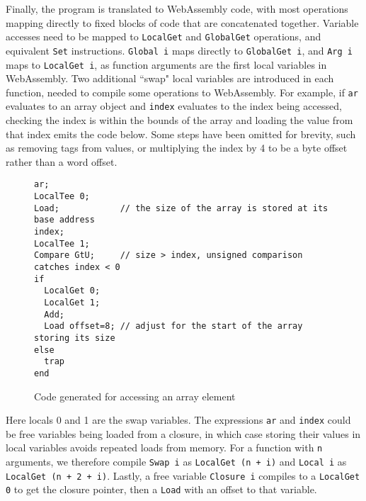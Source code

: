Finally, the program is translated to WebAssembly code, with most operations mapping directly to fixed blocks of code that are concatenated together. Variable accesses need to be mapped to \verb|LocalGet| and \verb|GlobalGet| operations, and equivalent \verb|Set| instructions. \verb|Global i| maps directly to \verb|GlobalGet i|, and \verb|Arg i| maps to \verb|LocalGet i|, as function arguments are the first local variables in WebAssembly. Two additional ``swap" local variables are introduced in each function, needed to compile some operations to WebAssembly. 
For example, if \verb|ar| evaluates to an array object and \verb|index| evaluates to the index being accessed, checking the index is within the bounds of the array and loading the value from that index emits the code below. Some steps have been omitted for brevity, such as removing tags from values, or multiplying the index by 4 to be a byte offset rather than a word offset.

\begin{figure}[H]
\begin{verbatim}
ar; 
LocalTee 0;
Load;            // the size of the array is stored at its base address
index; 
LocalTee 1; 
Compare GtU;     // size > index, unsigned comparison catches index < 0
if
  LocalGet 0;
  LocalGet 1;
  Add;
  Load offset=8; // adjust for the start of the array storing its size
else
  trap 
end
\end{verbatim}
\caption{Code generated for accessing an array element}
\end{figure}

Here locals 0 and 1 are the swap variables. The expressions \verb|ar| and \verb|index| could be free variables being loaded from a closure, in which case storing their values in local variables avoids repeated loads from memory. 
 For a function with \verb|n| arguments, we therefore compile \verb|Swap i| as \verb|LocalGet (n + i)| and \verb|Local i| as \verb|LocalGet (n + 2 + i)|. Lastly,  a free variable \verb|Closure i| compiles to a \verb|LocalGet 0| to get the closure pointer, then a \verb|Load| with an offset to that variable.




